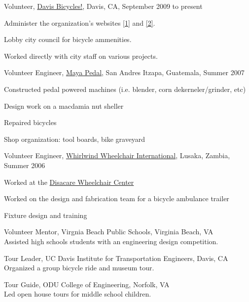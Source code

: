 \documentclass[10pt]{article}
\newenvironment{innerlist}[1][\enskip\textbullet]%
        {\begin{compactitem}[#1]}{\end{compactitem}}
\newcommand{\blankline}{\quad\pagebreak[2]}
\begin{document}
\blankline

Volunteer, \href{http://www.davisbicycles.org}{Davis Bicycles!}, Davis, CA, September 2009 to present
\begin{innerlist}
  \item Administer the organization's websites
      \href{http://www.davisbicycles.org}{[1]} and
      \href{http://www.bikedavis.info}{[2]}.
  \item Lobby city council for bicycle ammenities.
  \item Worked directly with city staff on various projects.
\end{innerlist}

\blankline

Volunteer Engineer, \href{http://www.mayapedal.org/}{Maya Pedal}, San Andres Itzapa, Guatemala, Summer 2007
\begin{innerlist}
\item Constructed pedal powered machines (i.e. blender, corn dekerneler/grinder, etc)
\item Design work on a macdamia nut sheller
\item Repaired bicycles
\item Shop organization: tool boards, bike graveyard
\end{innerlist}

\blankline

Volunteer Engineer, \href{http://www.whirlwindwheelchair.org/}{Whirlwind Wheelchair International}, Lusaka, Zambia, Summer 2006 
\begin{innerlist}
\item Worked at the \href{http://www.disacare.org.zm/}{Disacare Wheelchair Center}
\item Worked on the design and fabrication team for a bicycle ambulance trailer
\item Fixture design and training
\end{innerlist}

\blankline

Volunteer Mentor, Virgnia Beach Public Schools, Virginia Beach, VA\\
Assisted high schools students with an engineering design competition.

\blankline

Tour Leader, UC Davis Institute for Transportation Engineers, Davis, CA\\
Organized a group bicycle ride and museum tour.

\blankline

Tour Guide, ODU College of Engineering, Norfolk, VA\\
Led open house tours for middle school children.
\end{document}
